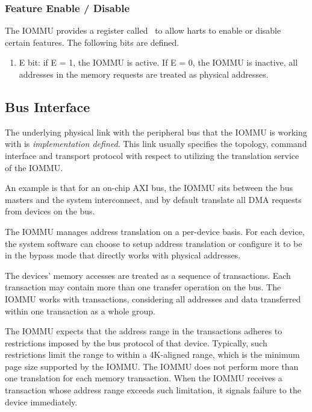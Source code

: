 \subsubsection{Feature Enable / Disable}

The IOMMU provides a register called \iommucapen\ to allow harts to enable or disable
certain features. The following bits are defined.

\begin{enumerate}
    \item E bit: if E = 1, the IOMMU is active. If E = 0, the IOMMU is inactive, all
        addresses in the memory requests are treated as physical addresses.
\end{enumerate}

\subsection{Bus Interface}

The underlying physical link with the peripheral bus that the IOMMU is working with is
\textit{implementation defined}. This link usually specifies the topology, command
interface and transport protocol with respect to utilizing the translation service of
the IOMMU.

An example is that for an on-chip AXI bus, the IOMMU sits between the bus masters and the
system interconnect, and by default translate all DMA requests from devices on the bus.

The IOMMU manages address translation on a per-device basis. For each device, the system
software can choose to setup address translation or configure it to be in the bypass mode
that directly works with physical addresses. 

The devices' memory accesses are treated as a sequence of transactions. Each transaction
may contain more than one transfer operation on the bus. The IOMMU works with
transactions, considering all addresses and data transferred within one transaction as a
whole group.

The IOMMU expects that the address range in the transactions adheres to restrictions
imposed by the bus protocol of that device. Typically, such restrictions limit the range
to within a 4K-aligned range, which is the minimum page size supported by the IOMMU. The
IOMMU does not perform more than one translation for each memory transaction. When the
IOMMU receives a transaction whose address range exceeds such limitation, it signals
failure to the device immediately.

